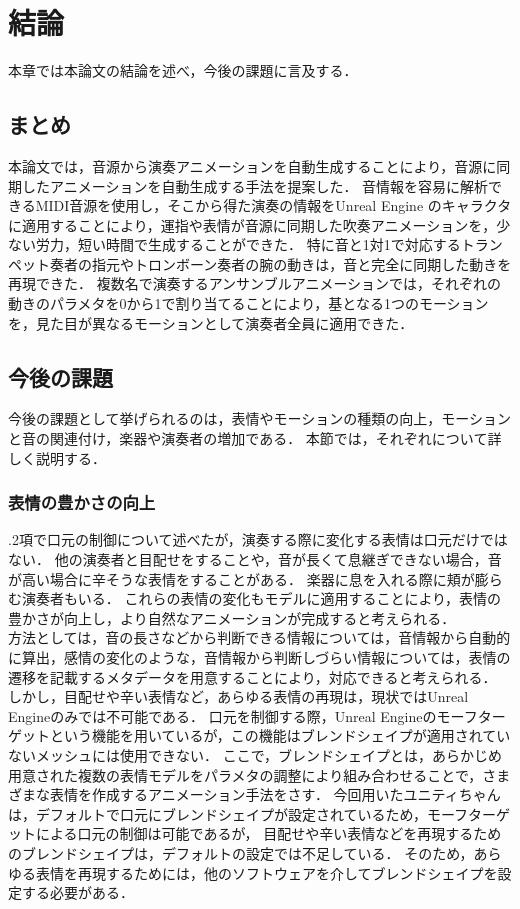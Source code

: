 \chapter{結論}
\label{chap:conclusion}
本章では本論文の結論を述べ，今後の課題に言及する．

\section{まとめ}
本論文では，音源から演奏アニメーションを自動生成することにより，音源に同期したアニメーションを自動生成する手法を提案した．
音情報を容易に解析できるMIDI音源を使用し，そこから得た演奏の情報をUnreal Engine のキャラクタに適用することにより，運指や表情が音源に同期した吹奏アニメーションを，少ない労力，短い時間で生成することができた．
特に音と1対1で対応するトランペット奏者の指元やトロンボーン奏者の腕の動きは，音と完全に同期した動きを再現できた．
複数名で演奏するアンサンブルアニメーションでは，それぞれの動きのパラメタを0から1で割り当てることにより，基となる1つのモーションを，見た目が異なるモーションとして演奏者全員に適用できた．

\section{今後の課題}
今後の課題として挙げられるのは，表情やモーションの種類の向上，モーションと音の関連付け，楽器や演奏者の増加である．
本節では，それぞれについて詳しく説明する．

\subsection{表情の豊かさの向上}
{.2項}で口元の制御について述べたが，演奏する際に変化する表情は口元だけではない．
他の演奏者と目配せをすることや，音が長くて息継ぎできない場合，音が高い場合に辛そうな表情をすることがある．
楽器に息を入れる際に頬が膨らむ演奏者もいる．
これらの表情の変化もモデルに適用することにより，表情の豊かさが向上し，より自然なアニメーションが完成すると考えられる．\\
\indent
方法としては，音の長さなどから判断できる情報については，音情報から自動的に算出，感情の変化のような，音情報から判断しづらい情報については，表情の遷移を記載するメタデータを用意することにより，対応できると考えられる．\\
\indent
しかし，目配せや辛い表情など，あらゆる表情の再現は，現状ではUnreal Engineのみでは不可能である．
口元を制御する際，Unreal Engineのモーフターゲットという機能を用いているが，この機能はブレンドシェイプが適用されていないメッシュには使用できない．
ここで，ブレンドシェイプとは，あらかじめ用意された複数の表情モデルをパラメタの調整により組み合わせることで，さまざまな表情を作成するアニメーション手法をさす．
今回用いたユニティちゃんは，デフォルトで口元にブレンドシェイプが設定されているため，モーフターゲットによる口元の制御は可能であるが，
目配せや辛い表情などを再現するためのブレンドシェイプは，デフォルトの設定では不足している．
そのため，あらゆる表情を再現するためには，他のソフトウェアを介してブレンドシェイプを設定する必要がある．

